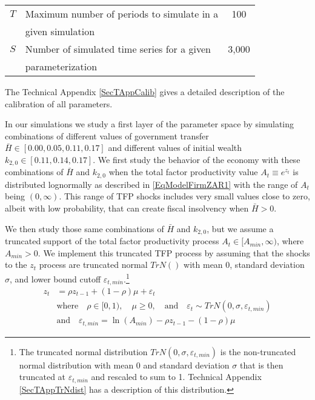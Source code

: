 \documentclass[letterpaper,12pt]{article}
\theoremstyle{definition}
\newcommand\ve{\varepsilon}
\begin{document}
\begin{spacing}{1.5}
\begin{table}[htbp]
\begin{threeparttable}
\begin{tabular}{>{\small}c >{\small}l >{\small}c}
          $T$ & Maximum number of periods to simulate in a & 100 \\
              & \quad given simulation & \\
          $S$ & Number of simulated time series for a given & 3,000 \\
              & \quad parameterization & \\
          \hline\hline
      \end{tabular}
      \begin{tablenotes}
          \scriptsize{\item[]The Technical Appendix \ref{SecTAppCalib} gives a detailed description of the calibration of all parameters.}
      \end{tablenotes}
      \end{threeparttable}
  \end{table}

  In our simulations we study a first layer of the parameter space by simulating combinations of different values of government transfer $\bar{H}\in[0.00, 0.05, 0.11, 0.17]$ and different values of initial wealth $k_{2,0}\in[0.11, 0.14, 0.17]$. We first study the behavior of the economy with these combinations of $\bar{H}$ and $k_{2,0}$ when the total factor productivity value $A_t\equiv e^{z_t}$ is distributed lognormally as described in \eqref{EqModelFirmZAR1} with the range of $A_t$ being $(0,\infty)$. This range of TFP shocks includes very small values close to zero, albeit with low probability, that can create fiscal insolvency when $\bar{H}>0$.

  We then study those same combinations of $\bar{H}$ and $k_{2,0}$, but we assume a truncated support of the total factor productivity process $A_t\in[A_{min},\infty)$, where $A_{min}>0$. We implement this truncated TFP process by assuming that the shocks to the $z_t$ process are truncated normal $TrN()$ with mean 0, standard deviation $\sigma$, and lower bound cutoff $\ve_{t,min}$.\footnote{The truncated normal distribution $TrN(0,\sigma, \ve_{t,min})$ is the non-truncated normal distribution with mean 0 and standard deviation $\sigma$ that is then truncated at $\ve_{t,min}$ and rescaled to sum to 1. Technical Appendix \ref{SecTAppTrNdist} has a description of this distribution.}
  \begin{equation}\label{EqSimsZAR1_trunc}
    \begin{split}
      z_t &= \rho z_{t-1} + (1-\rho)\mu + \ve_t \\
      &\text{where}\quad \rho\in[0,1),\quad\mu\geq 0, \quad\text{and}\quad \ve_t \sim TrN(0,\sigma, \ve_{t,min}) \\
      &\text{and}\quad \ve_{t,min} = \ln(A_{min}) - \rho z_{t-1} - (1 - \rho)\mu
    \end{split}
  \end{equation}


\end{spacing}
\end{document}

